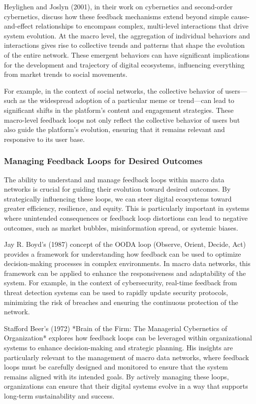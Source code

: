 \documentclass[12pt,twoside]{article}
\begin{document}
Heylighen and Joslyn (2001), in their work on cybernetics and second-order cybernetics, discuss how these feedback mechanisms extend beyond simple cause-and-effect relationships to encompass complex, multi-level interactions that drive system evolution. At the macro level, the aggregation of individual behaviors and interactions gives rise to collective trends and patterns that shape the evolution of the entire network. These emergent behaviors can have significant implications for the development and trajectory of digital ecosystems, influencing everything from market trends to social movements.

For example, in the context of social networks, the collective behavior of users—such as the widespread adoption of a particular meme or trend—can lead to significant shifts in the platform’s content and engagement strategies. These macro-level feedback loops not only reflect the collective behavior of users but also guide the platform’s evolution, ensuring that it remains relevant and responsive to its user base.

\subsubsection{Managing Feedback Loops for Desired Outcomes}

The ability to understand and manage feedback loops within macro data networks is crucial for guiding their evolution toward desired outcomes. By strategically influencing these loops, we can steer digital ecosystems toward greater efficiency, resilience, and equity. This is particularly important in systems where unintended consequences or feedback loop distortions can lead to negative outcomes, such as market bubbles, misinformation spread, or systemic biases.

Jay R. Boyd’s (1987) concept of the OODA loop (Observe, Orient, Decide, Act) provides a framework for understanding how feedback can be used to optimize decision-making processes in complex environments. In macro data networks, this framework can be applied to enhance the responsiveness and adaptability of the system. For example, in the context of cybersecurity, real-time feedback from threat detection systems can be used to rapidly update security protocols, minimizing the risk of breaches and ensuring the continuous protection of the network.

Stafford Beer’s (1972) *Brain of the Firm: The Managerial Cybernetics of Organization* explores how feedback loops can be leveraged within organizational systems to enhance decision-making and strategic planning. His insights are particularly relevant to the management of macro data networks, where feedback loops must be carefully designed and monitored to ensure that the system remains aligned with its intended goals. By actively managing these loops, organizations can ensure that their digital systems evolve in a way that supports long-term sustainability and success.
\end{document}
